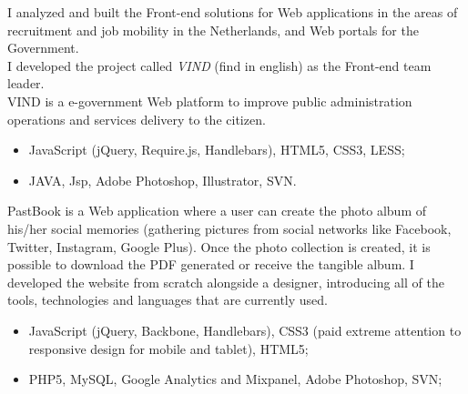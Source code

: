 \documentclass[11pt,a4paper]{moderncv-mod}
\begin{document}
{I analyzed and built the Front-end solutions for Web applications in the areas of recruitment and job mobility in the Netherlands, and Web portals for the Government.\\
I developed the project called \emph{VIND} (find in english) as the Front-end team leader.\\
VIND is a e-government Web platform to improve public administration operations and services delivery to the citizen.
\begin{itemize}%
\item JavaScript (jQuery, Require.js, Handlebars), HTML5, CSS3, LESS;
\item JAVA, Jsp, Adobe Photoshop, Illustrator, SVN.
\end{itemize}%
}

{PastBook is a Web application where a user can create the photo album of his/her social memories (gathering pictures from social networks like Facebook, Twitter, Instagram, Google Plus). Once the photo collection is created, it is possible to download the PDF generated or receive the tangible album.
I developed the website from scratch alongside a designer, introducing all of the tools, technologies and languages that are currently used.
\begin{itemize}%
\item JavaScript (jQuery, Backbone, Handlebars), CSS3 (paid extreme attention to responsive design for mobile and tablet), HTML5;
\item PHP5, MySQL, Google Analytics and Mixpanel, Adobe Photoshop, SVN;
\end{itemize}%
}
\end{document}
